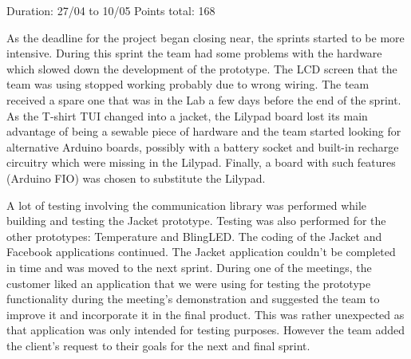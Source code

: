 Duration: 27/04 to 10/05\newline
Points total: 168

As the deadline for the project began closing near, the sprints started to be
more intensive. During this sprint the team had some problems with the hardware
which slowed down the development of the prototype. The LCD screen that the team
was using stopped working probably due to wrong wiring. The team received a
spare one that was in the Lab a few days before the end of the sprint. As the
T-shirt TUI changed into a jacket, the Lilypad board lost its main advantage
of being a sewable piece of hardware and the team started looking for alternative
Arduino boards, possibly with a battery socket and built-in recharge circuitry
which were missing in the Lilypad. Finally, a board with such features
(Arduino FIO) was chosen to substitute the Lilypad.

A lot of testing involving
the communication library was performed while building and testing the Jacket prototype.
Testing was also performed for the other prototypes: Temperature and BlingLED.
The coding of the Jacket and Facebook applications continued.
The Jacket application couldn't be completed in time and was moved to the next
sprint. During one of the meetings, the customer liked an application that we
were using for testing the prototype functionality during the meeting's
demonstration and suggested the team to improve it and incorporate it in the
final product. This was rather unexpected as that application was only intended
for testing purposes. However the team added the client's request to their goals
for the next and final sprint.

